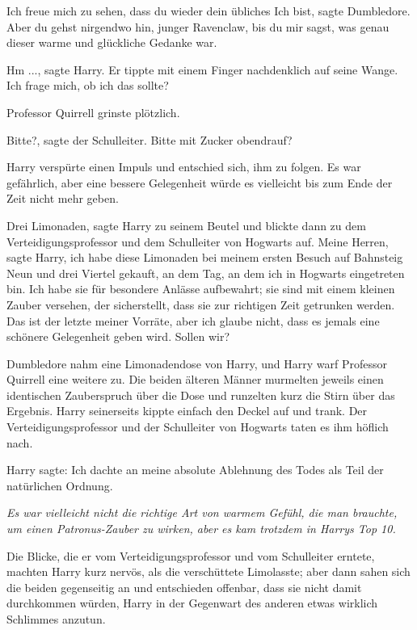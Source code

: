 \glqq{}Ich freue mich zu sehen, dass du wieder dein übliches Ich bist\grqq{},
sagte Dumbledore. \glqq{}Aber du gehst nirgendwo hin, junger Ravenclaw, bis du
mir sagst, was genau dieser warme und glückliche Gedanke war.\grqq{}

\glqq{}Hm ...\grqq{}, sagte Harry. Er tippte mit einem Finger nachdenklich auf
seine Wange. \glqq{}Ich frage mich, ob ich das sollte?\grqq{}

Professor Quirrell grinste plötzlich.

\glqq{}Bitte?\grqq{}, sagte der Schulleiter. \glqq{}Bitte mit Zucker obendrauf?\grqq{}

Harry verspürte einen Impuls und entschied sich, ihm zu folgen. Es war
gefährlich, aber eine bessere Gelegenheit würde es vielleicht bis zum Ende der
Zeit nicht mehr geben.

\glqq{}Drei Limonaden\grqq{}, sagte Harry zu seinem Beutel und blickte dann zu
dem Verteidigungsprofessor und dem Schulleiter von Hogwarts auf. \glqq{}Meine
Herren\grqq{}, sagte Harry, \glqq{}ich habe diese Limonaden bei meinem ersten
Besuch auf Bahnsteig Neun und drei Viertel gekauft, an dem Tag, an dem ich in
Hogwarts eingetreten bin. Ich habe sie für besondere Anlässe aufbewahrt; sie
sind mit einem kleinen Zauber versehen, der sicherstellt, dass sie zur richtigen
Zeit getrunken werden. Das ist der letzte meiner Vorräte, aber ich glaube nicht,
dass es jemals eine schönere Gelegenheit geben wird. Sollen wir?\grqq{}

Dumbledore nahm eine Limonadendose von Harry, und Harry warf Professor Quirrell
eine weitere zu. Die beiden älteren Männer murmelten jeweils einen identischen
Zauberspruch über die Dose und runzelten kurz die Stirn über das Ergebnis. Harry
seinerseits kippte einfach den Deckel auf und trank. Der Verteidigungsprofessor
und der Schulleiter von Hogwarts taten es ihm höflich nach.

Harry sagte: \glqq{}Ich dachte an meine absolute Ablehnung des Todes als Teil der
natürlichen Ordnung.\grqq{}

\emph{Es war vielleicht nicht die richtige Art von warmem Gefühl, die man
brauchte, um einen Patronus-Zauber zu wirken, aber es kam trotzdem in Harrys
Top 10.}

Die Blicke, die er vom Verteidigungsprofessor und vom Schulleiter erntete,
machten Harry kurz nervös, als die verschüttete Limolasste; aber dann sahen sich
die beiden gegenseitig an und entschieden offenbar, dass sie nicht damit
durchkommen würden, Harry in der Gegenwart des anderen etwas wirklich Schlimmes
anzutun.

